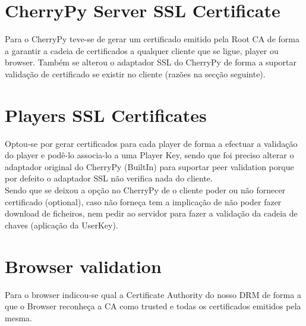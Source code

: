 \documentclass[11pt,a4paper]{report}
\begin{document}
\section{CherryPy Server SSL Certificate}

Para o CherryPy teve-se de gerar um certificado emitido pela Root CA de forma a garantir a cadeia de certificados a qualquer cliente que se ligue, player ou browser. Também se alterou o adaptador SSL do CherryPy de forma a suportar validação de certificado se existir no cliente (razões na secção seguinte).

\section{Players SSL Certificates}

Optou-se por gerar certificados para cada player de forma a efectuar a validação do player e podê-lo associa-lo a uma Player Key, sendo que foi preciso alterar o adaptador original do CherryPy (BuiltIn) para suportar peer validation porque por defeito o adaptador SSL não verifica nada do cliente.\\

Sendo que se deixou a opção no CherryPy de o cliente poder ou não fornecer certificado (optional), caso não forneça tem a implicação de não poder fazer download de ficheiros, nem pedir ao servidor para fazer a validação da cadeia de chaves (aplicação da UserKey). 

\section{Browser validation}
Para o browser indicou-se qual a Certificate Authority do nosso DRM de forma a que o Browser reconheça a CA como trusted e todas os certificados emitidos pela mesma.
\end{document}
